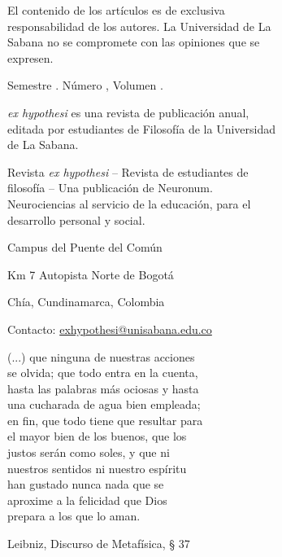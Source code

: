 {\begin{flushleft}
El contenido de los artículos es de exclusiva\\
responsabilidad de los autores. La Universidad de La\\
Sabana no se compromete con las opiniones que se\\
expresen.

Semestre \semestre{}. Número \numeroRevista{}, Volumen \volumen{}.

\textit{ex hypothesi} es una revista de publicación anual,\\
editada por estudiantes de Filosofía de la Universidad\\
de La Sabana.

Revista \textit{ex hypothesi} – Revista de estudiantes de\\
filosofía – Una publicación de Neuronum.\\
Neurociencias al servicio de la educación, para el\\
desarrollo personal y social.

Campus del Puente del Común

Km 7 Autopista Norte de Bogotá

Chía, Cundinamarca, Colombia

\noindent Contacto: \href{mailto:exhypothesi@unisabana.edu.co}{exhypothesi@unisabana.edu.co}

\end{flushleft}

\newpage



{\parindent0pt
(...) que ninguna de nuestras acciones\\
se olvida; que todo entra en la cuenta,\\
hasta las palabras más ociosas y hasta\\
una cucharada de agua bien empleada;\\
en fin, que todo tiene que resultar para\\
el mayor bien de los buenos, que los\\
justos serán como soles, y que ni\\
nuestros sentidos ni nuestro espíritu\\
han gustado nunca nada que se\\
aproxime a la felicidad que Dios\\
prepara a los que lo aman.

Leibniz, Discurso de Metafísica, § 37
}			%

}			%